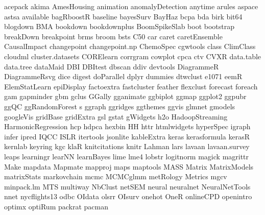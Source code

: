 \documentclass[11pt]{article} %
\begin{document}
\begin{itemize}
      acepack 
      akima
      AmesHousing
      animation
      anomalyDetection
      anytime
      arules
      aspace
      astsa
      available
      bagRboostR
      baseline  
      bayesSurv
      BayHaz 
      bcpa
      bda 
      birk
      bit64
      blogdown
      BMA
      bookdown
      bookdownplus
      BoomSpikeSlab
      boot
      bootstrap
      breakDown
      breakpoint
      brms  
      broom
      bsts
      C50
      car
      caret 
      caretEnsemble
      CausalImpact
      changepoint
      changepoint.np
      ChemoSpec
      cgwtools
      class
      ClimClass
      cloudml
      cluster.datasets 
      CORElearn 
      corrgram 
      cowplot
      cpca
      ctv
      CVXR
      data.table
      data.tree 
      dataMaid
      DBI
      DBItest
      dbscan
      ddiv
      devtools 
      DiagrammeR
      DiagrammeRsvg
      dice
      digest 
      doParallel
      dplyr 
      dummies
      dtwclust
      e1071
      eemR 
      ElemStatLearn
      epiDisplay
      factoextra
      fastcluster 
      feather
      flexclust 
      forecast
      foreach
      gam
      gapminder
      gbm 
      gclus 
      GGally 
      gganimate
      ggbiplot   
      ggmap 
      ggplot2
      ggpubr
      ggQC
      ggRandomForest s
      ggraph
      ggridges
      ggthemes
      ggvis 
      glmnet 
      gmodels 
      googleVis  
      gridBase 
      gridExtra 
      gsl
      gstat
      gWidgets
      h2o
      HadoopStreaming  
      HarmonicRegression
      hcp 
      hdpca
      hexbin  
      HH 
      httr 
      htmlwidgets
      hyperSpec 
      igraph
      infer 
      ipred 
      IQCC 
      ISLR 
      itertools 
      jsonlite
      kableExtra
      keras
      kerasformula
      kerasR
      kernlab 
      keyring
      kgc
      klaR 
      knitcitations 
      knitr 
      Lahman
      lars 
      lavaan 
      lavaan.survey 
      leaps
      learningr
      learNN
      learnBayes
      lime 
      lme4 
      lobstr
      logitnorm 
      magick
      magrittr 
      Make 
      mapdata
      Mapmate
      mapproj
      maps
      maptools
      MASS 
      Matrix 
      MatrixModels 
      matrixStats 
      markovchain
      mcmc
      MCMCglmm
      metRology
      Metrics
      mgcv
      minpack.lm
      MTS
      multiway
      NbClust
      netSEM
      neural 
      neuralnet 
      NeuralNetTools
      nnet
      nycflights13
      odbc
      OIdata  
      olsrr
      OIsurv 
      onehot
      OneR
      onlineCPD
      openintro 
      optimx
      optiRum
      packrat 
      pacman

\end{itemize}
\end{document}
